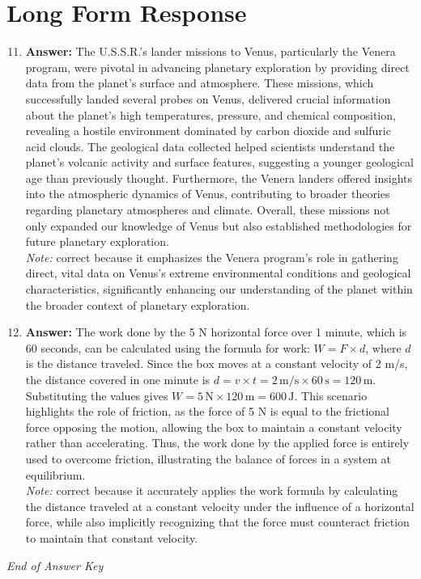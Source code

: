 \documentclass[12pt]{article}
\begin{document}
\section*{Long Form Response}
\begin{enumerate}[label=\arabic*.]
\setcounter{enumi}{10}
\item \textbf{Answer:} The U.S.S.R.'s lander missions to Venus, particularly the Venera program, were pivotal in advancing planetary exploration by providing direct data from the planet's surface and atmosphere. These missions, which successfully landed several probes on Venus, delivered crucial information about the planet's high temperatures, pressure, and chemical composition, revealing a hostile environment dominated by carbon dioxide and sulfuric acid clouds. The geological data collected helped scientists understand the planet's volcanic activity and surface features, suggesting a younger geological age than previously thought. Furthermore, the Venera landers offered insights into the atmospheric dynamics of Venus, contributing to broader theories regarding planetary atmospheres and climate. Overall, these missions not only expanded our knowledge of Venus but also established methodologies for future planetary exploration.
\\ \textit{Note:} correct because it emphasizes the Venera program's role in gathering direct, vital data on Venus's extreme environmental conditions and geological characteristics, significantly enhancing our understanding of the planet within the broader context of planetary exploration.
\item \textbf{Answer:} The work done by the 5 N horizontal force over 1 minute, which is 60 seconds, can be calculated using the formula for work: \( W = F \times d \), where \( d \) is the distance traveled. Since the box moves at a constant velocity of 2 m/s, the distance covered in one minute is \( d = v \times t = 2 \, \text{m/s} \times 60 \, \text{s} = 120 \, \text{m} \). Substituting the values gives \( W = 5 \, \text{N} \times 120 \, \text{m} = 600 \, \text{J} \). This scenario highlights the role of friction, as the force of 5 N is equal to the frictional force opposing the motion, allowing the box to maintain a constant velocity rather than accelerating. Thus, the work done by the applied force is entirely used to overcome friction, illustrating the balance of forces in a system at equilibrium.
\\ \textit{Note:} correct because it accurately applies the work formula by calculating the distance traveled at a constant velocity under the influence of a horizontal force, while also implicitly recognizing that the force must counteract friction to maintain that constant velocity.
\end{enumerate}

\vfill
\noindent\textit{End of Answer Key}
\end{document}
